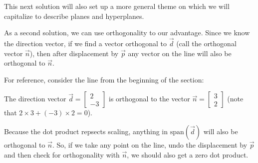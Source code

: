 \documentclass{ximera}
\begin{document}
This next solution will also set up a more general theme on which we will capitalize to describe planes and hyperplanes.

\begin{solution}

  As a second solution, we can use orthogonality to our advantage. Since we know the direction vector, if we find a vector orthogonal to $\vec{d}$ (call the orthogonal vector $\vec{n}$), then after displacement by $\vec{p}$ any vector on the line will also be orthogonal to $\vec{n}$.

  For reference, consider the line from the beginning of the section:

  \begin{center}
    \end{center}

  The direction vector $\vec{d}=\begin{bmatrix}
    2\\-3
  \end{bmatrix}$ is orthogonal to the vector $\vec{n}=\begin{bmatrix}
    3\\2
  \end{bmatrix}$ (note that $2\times 3+(-3)\times 2=0$).

  Because the dot product repsects scaling, anything in $\mbox{span}(\vec{d})$ will also be orthogonal to $\vec{n}$. So, if we take any point on the line, undo the displacement by $\vec{p}$ and then check for orthogonality with $\vec{n}$, we should also get a zero dot product.


\end{solution}
\end{document}
